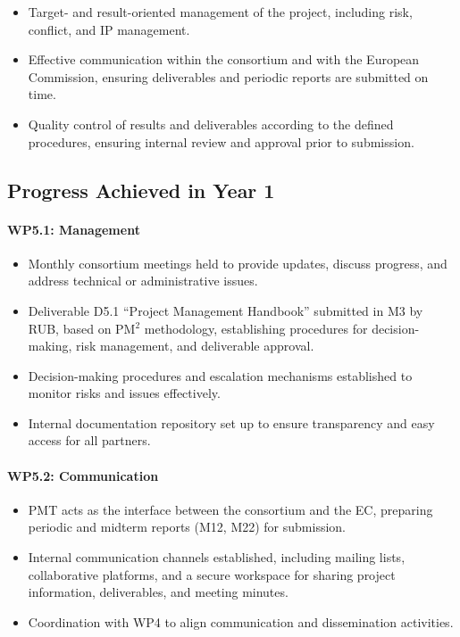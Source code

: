 \documentclass[a4paper,12pt, numbers]{article}
\begin{document}
\begin{itemize}[left=1em, itemsep=0pt, topsep=0pt]
\item Target- and result-oriented management of the project, including risk, conflict, and IP management.
\item Effective communication within the consortium and with the European Commission, ensuring deliverables and periodic reports are submitted on time.
\item Quality control of results and deliverables according to the defined procedures, ensuring internal review and approval prior to submission.
\end{itemize}

\subsection{Progress Achieved in Year 1} %

\paragraph{WP5.1: Management} %
\begin{itemize}[left=1em, itemsep=0pt, topsep=0pt]
\item Monthly consortium meetings held to provide updates, discuss progress, and address technical or administrative issues.
\item Deliverable D5.1 ``Project Management Handbook'' submitted in M3 by RUB, based on PM$^2$ methodology, establishing procedures for decision-making, risk management, and deliverable approval.
\item Decision-making procedures and escalation mechanisms established to monitor risks and issues effectively.
\item Internal documentation repository set up to ensure transparency and easy access for all partners.
\end{itemize}

\paragraph{WP5.2: Communication} %
\begin{itemize}[left=1em, itemsep=0pt, topsep=0pt]
\item PMT acts as the interface between the consortium and the EC, preparing periodic and midterm reports (M12, M22) for submission.
\item Internal communication channels established, including mailing lists, collaborative platforms, and a secure workspace for sharing project information, deliverables, and meeting minutes.
\item Coordination with WP4 to align communication and dissemination activities.
\end{itemize}
\end{document}
